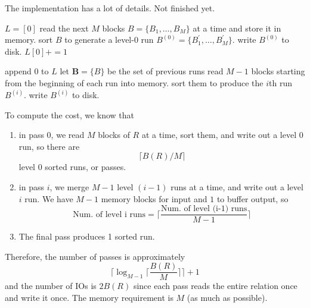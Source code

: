 \documentclass{article}
\begin{document}
      \begin{algo}
        The implementation has a lot of details. Not finished yet. 
        \begin{algorithm}[H]
          \begin{algorithmic}
              \State $L = [0]$ 
               
                \State read the next $M$ blocks $B = \{B_1, \ldots, B_M \}$ at a time and store it in memory.
                \State sort $B$ to generate a level-0 run $B^{(0)} = \{B_1^\prime, \ldots, B_M^\prime \}$.
                \State write $B^{(0)}$ to disk. 
                \State $L[0] += 1$
              \EndWhile

                \State append $0$ to $L$ 
                \State let $\mathbf{B} = \{B\}$ be the set of previous runs 
                  \State read $M-1$ blocks starting from the beginning of each run into memory. 
                  \State sort them to produce the $i$th run $B^{(i)}$. 
                  \State write $B^{(i)}$ to disk. 
                \EndWhile
              \EndWhile

            \EndFunction
          \end{algorithmic}
        \end{algorithm}
        To compute the cost, we know that 
        \begin{enumerate}
          \item in pass 0, we read $M$ blocks of $R$ at a time, sort them, and write out a level 0 run, so there are 
            \begin{equation}
              \lceil B(R) / M \rceil
            \end{equation}
            level 0 sorted runs, or passes. 

          \item in pass $i$, we merge $M-1$ level $(i-1)$ runs at a time, and write out a level $i$ run. We have $M-1$ memory blocks for input and $1$ to buffer output, so 
            \begin{equation}
              \text{Num. of level i runs} = \bigg\lceil \frac{\text{Num. of level (i-1) runs}}{M-1} \bigg\rceil 
            \end{equation}

          \item The final pass produces 1 sorted run. 
        \end{enumerate}

        Therefore, the number of passes is approximately 
        \begin{equation}
          \bigg\lceil \log_{M-1} \Big\lceil \frac{B(R)}{M} \Big\rceil \bigg\rceil + 1
        \end{equation}
        and the number of IOs is $2 B(R)$ since each pass reads the entire relation once and write it once. The memory requirement is $M$ (as much as possible). 
      \end{algo}
\end{document}
